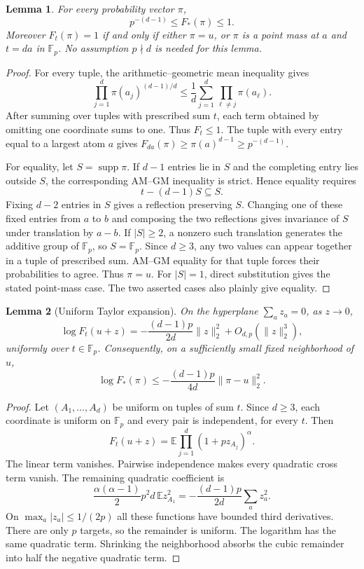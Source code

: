 \documentclass[11pt]{article}
\newtheorem{lemma}{Lemma}
\newcommand{\Fp}{\mathbb F_p}
\begin{document}
\begin{lemma}\label{lem:row}
For every probability vector $\pi$,
\[
 p^{-(d-1)}\le F_*(\pi)\le1.
\]
Moreover $F_t(\pi)=1$ if and only if either $\pi=u$, or $\pi$ is
a point mass at $a$ and $t=da$ in $\Fp$. No assumption $p\nmid d$
is needed for this lemma.
\end{lemma}
\begin{proof}
For every tuple, the arithmetic--geometric mean inequality gives
\[
 \prod_{j=1}^d\pi(a_j)^{(d-1)/d}
 \le\frac1d\sum_{j=1}^d\prod_{\ell\ne j}\pi(a_\ell).
\]
After summing over tuples with prescribed sum $t$, each term obtained
by omitting one coordinate sums to one. Thus $F_t\le1$.
The tuple with every entry equal to a largest atom $a$ gives
$F_{da}(\pi)\ge\pi(a)^{d-1}\ge p^{-(d-1)}$.

For equality, let $S=\operatorname{supp}\pi$. If $d-1$ entries lie in
$S$ and the completing entry lies outside $S$, the corresponding AM--GM
inequality is strict. Hence equality requires
\[
 t-(d-1)S\subseteq S.
\]
Fixing $d-2$ entries in $S$ gives a reflection preserving $S$.
Changing one of these fixed entries from $a$ to $b$ and composing the
two reflections gives invariance of $S$ under translation by $a-b$.
If $|S|\ge2$, a nonzero such translation generates the additive group
of $\Fp$, so $S=\Fp$. Since $d\ge3$, any two values can appear together
in a tuple of prescribed sum. AM--GM equality for that tuple forces
their probabilities to agree. Thus $\pi=u$. For $|S|=1$, direct
substitution gives the stated point-mass case. The two asserted cases
also plainly give equality.
\end{proof}

\begin{lemma}[Uniform Taylor expansion]\label{lem:taylor}
On the hyperplane $\sum_a z_a=0$, as $z\to0$,
\[
 \log F_t(u+z)
 =-\frac{(d-1)p}{2d}\|z\|_2^2+O_{d,p}(\|z\|_2^3),\label{eq:taylor}
\]
uniformly over $t\in\Fp$. Consequently, on a sufficiently small fixed
neighborhood of $u$,
\[
 \log F_*(\pi)\le-\frac{(d-1)p}{4d}\|\pi-u\|_2^2.
\]
\end{lemma}
\begin{proof}
Let $(A_1,\ldots,A_d)$ be uniform on tuples of sum $t$. Since $d\ge3$,
each coordinate is uniform on $\Fp$ and every pair is independent,
for every $t$. Then
\[
 F_t(u+z)=\mathbb E\prod_{j=1}^d(1+pz_{A_j})^\alpha.
\]
The linear term vanishes. Pairwise independence makes every quadratic
cross term vanish. The remaining quadratic coefficient is
\[
 \frac{\alpha(\alpha-1)}2p^2d\,
       \mathbb E z_{A_1}^2
 =-\frac{(d-1)p}{2d}\sum_a z_a^2.
\]
On $\max_a|z_a|\le1/(2p)$ all these functions have bounded third
derivatives. There are only $p$ targets, so the remainder is uniform.
The logarithm has the same quadratic term. Shrinking the neighborhood
absorbs the cubic remainder into half the negative quadratic term.
\end{proof}
\end{document}
